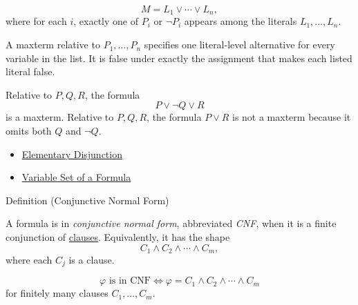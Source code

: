 \begin{remark*}
\[
M=L_1\lor\cdots\lor L_n,
\]
where for each \(i\), exactly one of \(P_i\) or \(\neg P_i\) appears among the
literals \(L_1,\ldots,L_n\).
\end{remark*}

\begin{remark*}[Interpretation]
A maxterm relative to \(P_1,\ldots,P_n\) specifies one literal-level
alternative for every variable in the list. It is false under exactly the
assignment that makes each listed literal false.
\end{remark*}

\begin{example*}[Examples]
Relative to \(P,Q,R\), the formula
\[
P\lor\neg Q\lor R
\]
is a maxterm. Relative to \(P,Q,R\), the formula \(P\lor R\) is not a maxterm
because it omits both \(Q\) and \(\neg Q\).
\end{example*}

\begin{dependencies}
\begin{itemize}
  \item \hyperref[def:elementary-disjunction-propositional-logic]{Elementary Disjunction}
  \item \hyperref[def:formula-variable-set-propositional-logic]{Variable Set of a Formula}
\end{itemize}
\end{dependencies}

\begin{definitionbox}{Definition (Conjunctive Normal Form)}
\begin{definition}
\label{def:conjunctive-normal-form-propositional-logic}
A formula is in \emph{conjunctive normal form}, abbreviated \emph{CNF}, when it
is a finite conjunction of
\hyperref[def:clause-propositional-logic]{clauses}. Equivalently, it has the
shape
\[
C_1\land C_2\land\cdots\land C_m,
\]
where each \(C_j\) is a clause.
\end{definition}
\end{definitionbox}

\begin{remark*}
\[
\varphi\text{ is in CNF}
\Longleftrightarrow
\varphi=C_1\land C_2\land\cdots\land C_m
\]
for finitely many clauses \(C_1,\ldots,C_m\).
\end{remark*}

